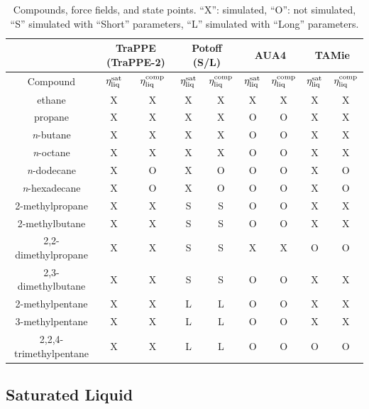 \documentclass[preprint,review,12pt]{elsarticle}
\begin{document}
	\begin{table}[h!]
		\caption{Compounds, force fields, and state points. ``X'': simulated, ``O'': not simulated, ``S'' simulated with ``Short'' parameters, ``L'' simulated with ``Long'' parameters.} \label{tab:simulations_performed}
		\begin{center}
			\begin{tabular}{|c|c|c|c|c|c|c|c|c|}
				\hline
				\multicolumn{1}{|c}{} & \multicolumn{2}{|c}{TraPPE (TraPPE-2)} & \multicolumn{2}{|c|}{Potoff (S/L)} & \multicolumn{2}{|c}{AUA4} & \multicolumn{2}{|c|}{TAMie}  \\ \hline
				Compound & $\eta_{\rm liq}^{\rm sat}$ & $\eta_{\rm liq}^{\rm comp}$ & $\eta_{\rm liq}^{\rm sat}$ & $\eta_{\rm liq}^{\rm comp}$ & $\eta_{\rm liq}^{\rm sat}$ & $\eta_{\rm liq}^{\rm comp}$ & $\eta_{\rm liq}^{\rm sat}$ & $\eta_{\rm liq}^{\rm comp}$ \\ \hline
				ethane & X & X & X & X & X & X & X & X \\ \hline
				propane & X & X & X & X & O & O & X & X \\ \hline
				\textit{n}-butane & X & X & X & X & O & O & X & X \\ \hline
				\textit{n}-octane & X & X & X & X & O & O & X & X \\ \hline
				\textit{n}-dodecane & X & O & X & O & O & O & X & O \\ \hline
				\textit{n}-hexadecane & X & O & X & O & O & O & X & O \\ \hline
				2-methylpropane & X & X & S & S & O & O & X & X \\ \hline
				2-methylbutane & X & X & S & S & O & O & X & X \\ \hline
				2,2-dimethylpropane & X & X & S & S & X & X & O & O \\ \hline
				2,3-dimethylbutane & X & X & S & S & O & O & X & X \\ \hline
				2-methylpentane & X & X & L & L & O & O & X & X \\ \hline
				3-methylpentane & X & X & L & L & O & O & X & X \\ \hline
				2,2,4-trimethylpentane & X & X & L & L & O & O & O & O \\ \hline
			\end{tabular}
		\end{center} 
	\end{table}
	
	\subsection{Saturated Liquid} \label{sec:eta_sat}
	
\end{document}
